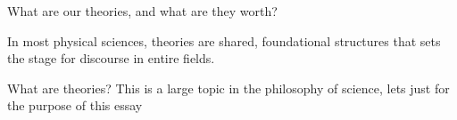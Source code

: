 What are our theories, and what are they worth?


In most physical sciences, theories are shared, foundational
structures that sets the stage for discourse in entire fields.

What are theories? This is a large topic in the philosophy of science,
lets just for the purpose of this essay 
